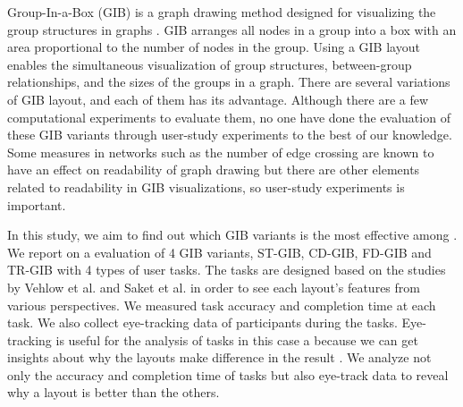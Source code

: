 \documentclass{llncs}
\begin{document}
Group-In-a-Box (GIB) is a graph drawing method designed for visualizing the group structures in graphs \cite{rodri,chatu,onoue}.
GIB arranges all nodes in a group into a box with an area proportional to the number of nodes in the group.
Using a GIB layout enables the simultaneous visualization of group structures, between-group relationships, and the sizes of the groups in a graph.
There are several variations of GIB layout, and each of them has its advantage.
Although there are a few computational experiments \cite{chatu,onoue} to evaluate them, no one have done the evaluation of these GIB variants through user-study experiments to the best of our knowledge.
Some measures in networks such as the number of edge crossing are known to have an effect on readability of graph drawing \cite{becker,pur97,pur98,pca} but there are other elements related to readability in GIB visualizations, so user-study experiments is important.

In this study, we aim to find out which GIB variants is the most effective among .
We report on a evaluation of 4 GIB variants, ST-GIB, CD-GIB, FD-GIB and TR-GIB with 4 types of user tasks.
The tasks are designed based on the studies by Vehlow et al. \cite{survey} and Saket et al. \cite{saket} in order to see each layout's features from various perspectives.
We measured task accuracy and completion time at each task.
We also collect eye-tracking data of participants during the tasks.
Eye-tracking is useful for the analysis of tasks in this case a because we can get insights about why the layouts make difference in the result \cite{eyemethod}.
We analyze not only the accuracy and completion time of tasks but also eye-track data to reveal why a layout is better than the others.
\end{document}
